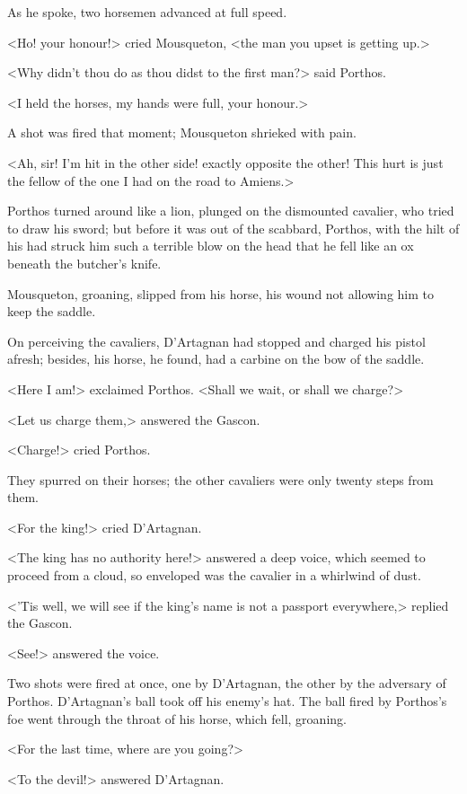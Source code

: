As he spoke, two horsemen advanced at full speed.

<Ho! your honour!> cried Mousqueton, <the man you upset is getting up.>

<Why didn't thou do as thou didst to the first man?> said Porthos.

<I held the horses, my hands were full, your honour.>

A shot was fired that moment; Mousqueton shrieked with pain.

<Ah, sir! I'm hit in the other side! exactly opposite the other! This hurt is just the fellow of the one I had on the road to Amiens.>

Porthos turned around like a lion, plunged on the dismounted cavalier, who tried to draw his sword; but before it was out of the scabbard, Porthos, with the hilt of his had struck him such a terrible blow on the head that he fell like an ox beneath the butcher's knife.

Mousqueton, groaning, slipped from his horse, his wound not allowing him to keep the saddle.

On perceiving the cavaliers, D'Artagnan had stopped and charged his pistol afresh; besides, his horse, he found, had a carbine on the bow of the saddle.

<Here I am!> exclaimed Porthos. <Shall we wait, or shall we charge?>

<Let us charge them,> answered the Gascon.

<Charge!> cried Porthos.

They spurred on their horses; the other cavaliers were only twenty steps from them.

<For the king!> cried D'Artagnan.

<The king has no authority here!> answered a deep voice, which seemed to proceed from a cloud, so enveloped was the cavalier in a whirlwind of dust.

<'Tis well, we will see if the king's name is not a passport everywhere,> replied the Gascon.

<See!> answered the voice.

Two shots were fired at once, one by D'Artagnan, the other by the adversary of Porthos. D'Artagnan's ball took off his enemy's hat. The ball fired by Porthos's foe went through the throat of his horse, which fell, groaning.

<For the last time, where are you going?>

<To the devil!> answered D'Artagnan.

